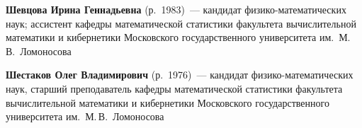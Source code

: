 \begin{multicols}{2}
\vspace*{3pt}

\noindent
\textbf{Шевцова Ирина Геннадьевна}  (р.\ 1983)~--- кандидат фи\-зи\-ко-математических наук; ассистент кафедры 
математической статистики факультета вычислительной математики и кибернетики Московского государственного 
университета им.\ М.\,В.~Ломоносова

\vspace*{3pt}

\noindent
\textbf{Шестаков Олег Владимирович} (р.\ 1976)~--- кандидат физико-математических наук,
старший преподаватель ка\-фед\-ры математической статистики факуль\-тета вычислительной математики и кибернетики
Московского государственного университета им.~М.\,В.~Ломоносова




\end{multicols}